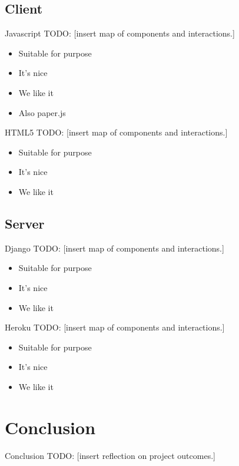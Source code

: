 \documentclass{beamer}
\begin{document}
\subsection{Client}

\begin{frame}{Javascript}
  TODO:
  [insert map of components and interactions.]
  \begin{itemize}
    \item Suitable for purpose
    \item It's nice
    \item We like it
    \item Also paper.js
  \end{itemize}
\end{frame}

\begin{frame}{HTML5}
  TODO:
  [insert map of components and interactions.]
  \begin{itemize}
    \item Suitable for purpose
    \item It's nice
    \item We like it
  \end{itemize}
\end{frame}

\subsection{Server}

\begin{frame}{Django}
  TODO:
  [insert map of components and interactions.]
  \begin{itemize}
    \item Suitable for purpose
    \item It's nice
    \item We like it
  \end{itemize}
\end{frame}

\begin{frame}{Heroku}
  TODO:
  [insert map of components and interactions.]
  \begin{itemize}
    \item Suitable for purpose
    \item It's nice
    \item We like it
  \end{itemize}
\end{frame}


\section{Conclusion}

\begin{frame}{Conclusion}
  TODO:
  [insert reflection on project outcomes.]
\end{frame}
\end{document}
